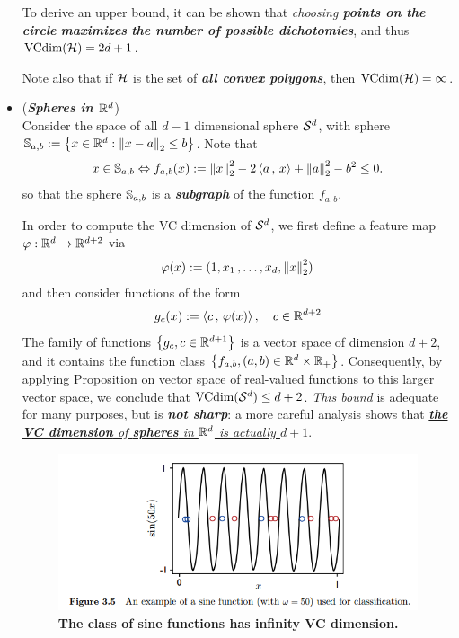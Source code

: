 \documentclass[11pt]{article}
\begin{document}
\begin{itemize}
\begin{example}
To derive an upper bound, it can be shown that \emph{choosing \textbf{points on the circle} \textbf{maximizes} \textbf{the number of possible dichotomies}}, and thus $\text{VCdim}({\mathcal H}) = 2d + 1$. 

Note also that if ${\mathcal H}$ is the set of \underline{\emph{\textbf{all convex polygons}}}, then \underline{$\text{VCdim}({\mathcal H}) = \infty$}.
\end{example}

\item \begin{example}(\textbf{\emph{Spheres in ${\mathbb R}^d$}})\\
Consider the space of all $d-1$ dimensional sphere ${\mathcal S}^{d}$, with sphere ${\mathbb S}_{a, b} := \left\{x \in {\mathbb R}^d: \left\|x - a\right\|_{2} \le b \right\}$. Note that 
\begin{align*}
x \in {\mathbb S}_{a, b} \Leftrightarrow  f_{a, b}(x) := \left\|x\right\|_{2}^2 - 2 \left\langle a\,,\, x \right\rangle +  \left\|a\right\|_{2}^2 - b^2 \le 0.
\end{align*} so that the sphere  ${\mathbb S}_{a,b}$ is a \emph{\textbf{subgraph}} of the function $f_{a,b}$. 

In order to compute the VC dimension of ${\mathcal S}^{d}$, we first define a feature map $\varphi: {\mathbb R}^d \to {\mathbb R}^{d+2}$ via
\begin{align*}
\varphi(x) := (1, x_1 \,{,}\ldots{,}\, x_d, \left\|x\right\|_{2}^2)
\end{align*}  and then consider functions of the form
\begin{align*}
g_c(x) := \left\langle c\,,\, \varphi(x) \right\rangle, \quad c\in {\mathbb R}^{d+2}
\end{align*} The family of functions $\left\{g_c, c \in {\mathbb R}^{d+1}\right\}$ is a vector space of dimension $d + 2$, and it contains the function class $\left\{ f_{a,b}, (a, b) \in {\mathbb R}^d \times {\mathbb R}_{+}\right\}$. Consequently, by applying Proposition on vector space of real-valued functions  to this larger vector space, we conclude that \underline{$\text{VCdim}({\mathcal S}^{d}) \le d+ 2$}. \emph{This bound} is adequate for many purposes, but is \emph{\textbf{not sharp}}: a more careful analysis shows that \underline{\emph{\textbf{the VC dimension} of \textbf{spheres} in ${\mathbb R}^d$ is actually $d + 1$}}.
\end{example}


\begin{figure}
\begin{minipage}[t]{1\linewidth}
  \centering
  \centerline{\includegraphics[scale = 0.6]{sine_vc_dim.png}}
\end{minipage}
\caption{\footnotesize{\textbf{The class of sine functions has infinity VC dimension. \citep{mohri2018foundations}}}}
\label{fig: sine_vc_dim}
\end{figure}


\end{itemize}
\end{document}
